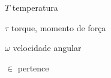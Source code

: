 \begin{simbolos}
  \item[$ T $] temperatura
  \item[$ \tau $] torque, momento de força
  \item[$ \omega $] velocidade angular
  \item[$ \in $] pertence
\end{simbolos}